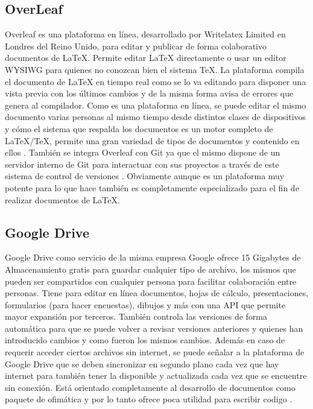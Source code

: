 \subsection{OverLeaf}
Overleaf es una plataforma en línea, desarrollado por Writelatex Limited en Londres del Reino Unido, para editar y publicar de forma colaborativo documentos de \LaTeX{}. Permite editar \LaTeX{} directamente o usar un editor WYSIWG para quienes no conozcan bien el sistema \TeX{}. La plataforma compila el documento de \LaTeX{} en tiempo real como se lo va editando para disponer una vista previa con los últimos cambios y de la misma forma avisa de errores que genera al compilador. Como es una plataforma en línea, se puede editar el mismo documento varias personas al mismo tiempo desde distintos clases de dispositivos y cómo el sistema que respalda los documentos es un motor completo de \LaTeX{}/\TeX{}, permite una gran variedad de tipos de documentos y contenido en ellos \citep{Overleaf}. También se integra Overleaf con Git ya que el mismo dispone de un servidor interno de Git para interactuar con sus proyectos a través de este sistema de control de versiones \citep{Overleaf-Git}. Obviamente aunque es un plataforma muy potente para lo que hace también es completamente especializado para el fin de realizar documentos de \LaTeX{}.

\subsection{Google Drive}
Google Drive como servicio de la misma empresa Google ofrece 15 Gigabytes de Almacenamiento gratis para guardar cualquier tipo de archivo, los mismos que pueden ser compartidos con cualquier persona para facilitar colaboración entre personas. Tiene para editar en línea documentos, hojas de cálculo, presentaciones, formularios (para hacer encuestas), dibujos y más con una API que permite mayor expansión por terceros. También controla las versiones de forma automática para que se puede volver a revisar versiones anteriores y quienes han introducido cambios y como fueron los mismos cambios. Además en caso de requerir acceder ciertos archivos sin internet, se puede señalar a la plataforma de Google Drive que se deben sincronizar en segundo plano cada vez que hay internet para también tener la disponible y actualizada cada vez que se encuentre sin conexión. Está orientado completamente al desarrollo de documentos como paquete de ofimática y por lo tanto ofrece poca utilidad para escribir codigo \citep{Google-Drive-Usage}.

